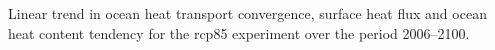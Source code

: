 \label{fig:full}
Linear trend in ocean heat transport convergence, surface heat flux and ocean heat content tendency for the rcp85 experiment over the period 2006--2100.
